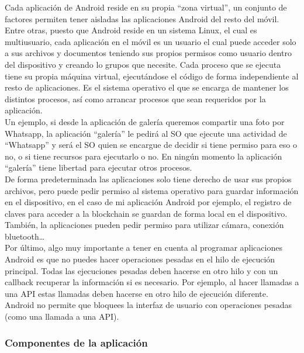 Cada aplicación de Android reside en su propia ``zona virtual'', un conjunto de factores permiten tener aisladas las aplicaciones Android del resto del móvil. Entre otras, puesto que Android reside en un sistema Linux, el cual es multiusuario, cada aplicación en el móvil es un usuario el cual puede acceder solo a sus archivos y documentos teniendo sus propios permisos como usuario dentro del dispositivo y creando lo grupos que necesite. Cada proceso que se ejecuta tiene su propia máquina virtual, ejecutándose el código de forma independiente al resto de aplicaciones. Es el sistema operativo el que se encarga de mantener los distintos procesos, así como arrancar procesos que sean requeridos por la aplicación. \\

Un ejemplo, si desde la aplicación de galería queremos compartir una foto por Whatsapp, la aplicación ``galería'' le pedirá al SO que ejecute una actividad de ``Whatsapp'' y será el SO quien se encargue de decidir si tiene permiso para eso o no, o si tiene recursos para ejecutarlo o no. En ningún momento la aplicación ``galería'' tiene libertad para ejecutar otros procesos. \\

De forma predeterminada las aplicaciones solo tiene derecho de usar sus propios archivos, pero puede pedir permiso al sistema operativo para guardar información en el dispositivo, en el caso de mi aplicación Android por ejemplo, el registro de claves para acceder a la blockchain se guardan de forma local en el dispositivo. También, la aplicaciones pueden pedir permiso para utilizar cámara, conexión bluetooth\dots \\

Por último, algo muy importante a tener en cuenta al programar aplicaciones Android es que no puedes hacer operaciones pesadas en el hilo de ejecución principal. Todas las ejecuciones pesadas deben hacerse en otro hilo y con un callback recuperar la información si es necesario. Por ejemplo, al hacer llamadas a una API estas llamadas deben hacerse en otro hilo de ejecución diferente. Android no permite que bloquees la interfaz de usuario con operaciones pesadas (como una llamada a una API).

\subsubsection{Componentes de la aplicación}

